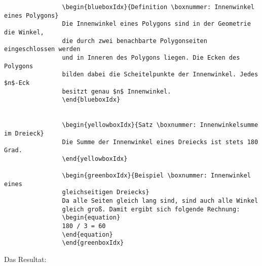 				\begin{verbatim}
				\begin{blueboxIdx}{Definition \boxnummer: Innenwinkel eines Polygons}
				Die Innenwinkel eines Polygons sind in der Geometrie die Winkel,
				die durch zwei benachbarte Polygonseiten eingeschlossen werden
				und in Inneren des Polygons liegen. Die Ecken des Polygons
				bilden dabei die Scheitelpunkte der Innenwinkel. Jedes $n$-Eck
				besitzt genau $n$ Innenwinkel.
				\end{blueboxIdx}


				\begin{yellowboxIdx}{Satz \boxnummer: Innenwinkelsumme im Dreieck}
				Die Summe der Innenwinkel eines Dreiecks ist stets 180 Grad.
				\end{yellowboxIdx}

				\begin{greenboxIdx}{Beispiel \boxnummer: Innenwinkel eines
				gleichseitigen Dreiecks}
				Da alle Seiten gleich lang sind, sind auch alle Winkel
				gleich groß. Damit ergibt sich folgende Rechnung:
				\begin{equation}
				180 / 3 = 60
				\end{equation}
				\end{greenboxIdx}
				\end{verbatim}

				Das Resultat: \newline

				\newline

